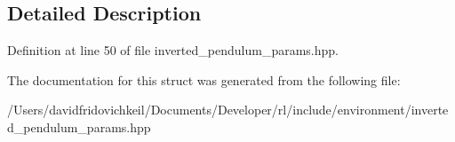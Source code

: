 \subsection{Detailed Description}


Definition at line 50 of file inverted\+\_\+pendulum\+\_\+params.\+hpp.



The documentation for this struct was generated from the following file\+:\begin{DoxyCompactItemize}
\item 
/\+Users/davidfridovichkeil/\+Documents/\+Developer/rl/include/environment/inverted\+\_\+pendulum\+\_\+params.\+hpp\end{DoxyCompactItemize}
